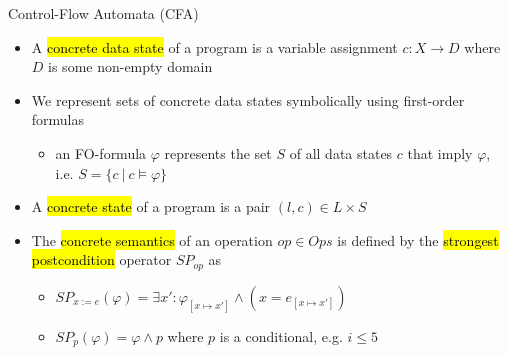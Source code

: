 
\begin{frame}{Control-Flow Automata (CFA)}
\begin{itemize}
  \itemsep1em 
  \item A \hl{concrete data state} of a program is a variable assignment $c:
  X \rightarrow D$ where $D$ is some non-empty domain
  
  \item We represent sets of concrete data states symbolically using first-order
  formulas \\
  \begin{itemize}
    \item an FO-formula $\varphi$ represents the set $S$ of all data states $c$
    that imply $\varphi$, i.e. $S = \{ c \ | \ c \models \varphi \}$
  \end{itemize}
  \item A \hl{concrete state} of a program is a pair $(l, c) \in L \times S$
  
  \item The \hl{concrete semantics} of an operation $op \in Ops$ is defined by
  the \hl{strongest postcondition} operator $SP_{op}$ as \\
    \begin{itemize}
      \itemsep 0.2cm 
      \item $SP_{x := e}(\varphi) = \exists x': \varphi_{[x \mapsto x' ]} \wedge
      (x = e_{[x \mapsto x']})$
      \item $SP_{p}(\varphi) = \varphi \wedge p$ where $p$ is a conditional, e.g. $i \leq 5$
    \end{itemize}
\end{itemize}

\end{frame}


